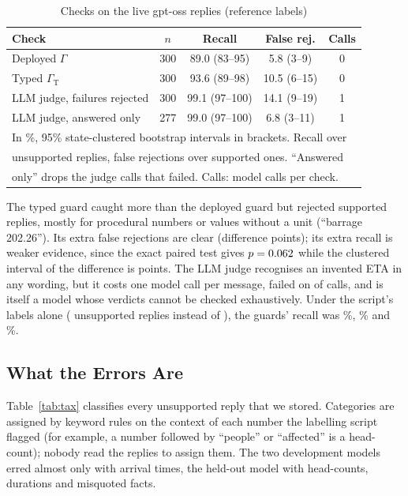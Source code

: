 \documentclass[conference]{IEEEtran}
\begin{document}
\begin{table}[t]
\caption{Checks on the \LiveN{} live gpt-oss replies (reference labels)}
\label{tab:live}
\centering
\footnotesize
\setlength{\tabcolsep}{2.4pt}
\begin{tabular}{lcccc}
\toprule
Check & $n$ & Recall & False rej. & Calls\\
\midrule
Deployed $\Gamma$ & 300 & 89.0 (83--95) & 5.8 (3--9) & 0\\
Typed $\Gamma_{\mathrm{T}}$ & 300 & 93.6 (89--98) & 10.5 (6--15) & 0\\
LLM judge, failures rejected & 300 & 99.1 (97--100) & 14.1 (9--19) & 1\\
LLM judge, answered only & 277 & 99.0 (97--100) & 6.8 (3--11) & 1\\
\bottomrule
\multicolumn{5}{l}{\scriptsize In \%, 95\% state-clustered bootstrap intervals in brackets. Recall over}\\
\multicolumn{5}{l}{\scriptsize unsupported replies, false rejections over supported ones. ``Answered}\\
\multicolumn{5}{l}{\scriptsize only'' drops the \JudFailN{} judge calls that failed. Calls: model calls per check.}\\
\end{tabular}
\end{table}

The typed guard caught more than the deployed guard but rejected \LiveTypFpN{} supported replies, mostly for procedural numbers or values without a unit (``barrage 202.26''). Its extra false rejections are clear (difference \TypDepFprDiffCi{} points); its extra recall is weaker evidence, since the exact paired test gives $p=0.062$ while the clustered interval of the difference is \TypDepRecDiffCi{} points. The LLM judge recognises an invented ETA in any wording, but it costs one model call per message, failed on \JudFailN{} of \LiveN{} calls, and is itself a model whose verdicts cannot be checked exhaustively. Under the script's labels alone (\PoDevUnsup{} unsupported replies instead of \LiveUnsup), the guards' recall was \PoDevDepRec\%, \PoDevTypRec\% and \PoDevVtwoRec\%.

\subsection{What the Errors Are}
Table~\ref{tab:tax} classifies every unsupported reply that we stored. Categories are assigned by keyword rules on the context of each number the labelling script flagged (for example, a number followed by ``people'' or ``affected'' is a head-count); nobody read the replies to assign them. The two development models erred almost only with arrival times, the held-out model with head-counts, durations and misquoted facts.
\end{document}
